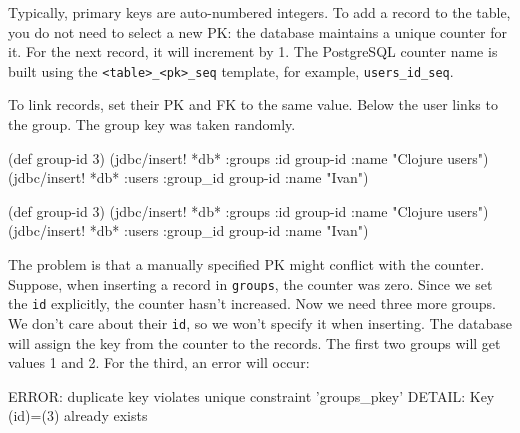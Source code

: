 
Typically, primary keys are auto-numbered integers. To add a record to the table, you do not need to select a new PK: the database maintains a unique counter for it. For the next record, it will increment by 1. The PostgreSQL counter name is built using the \verb|<table>_<pk>_seq| template, for example, \verb|users_id_seq|.

To link records, set their PK and FK to the same value. Below the user links to the group. The group key was taken randomly.

\ifnarrow

\begin{english}
  \begin{clojure}
(def group-id 3)
(jdbc/insert! *db* :groups
  {:id group-id :name "Clojure users"})
(jdbc/insert! *db* :users
  {:group_id group-id :name "Ivan"})
  \end{clojure}
\end{english}

\else

\begin{english}
  \begin{clojure}
(def group-id 3)
(jdbc/insert! *db* :groups {:id group-id :name "Clojure users"})
(jdbc/insert! *db* :users {:group_id group-id :name "Ivan"})
  \end{clojure}
\end{english}

\fi

The problem is that a manually specified PK might conflict with the counter. Suppose, when inserting a record in \verb|groups|, the counter was zero. Since we set the \verb|id| explicitly, the counter hasn't increased. Now we need three more groups. We don't care about their \verb|id|, so we won't specify it when inserting. The database will assign the key from the counter to the records. The first two groups will get values 1 and 2. For the third, an error will occur:


\ifnarrow

\begin{english}
  \begin{text}
ERROR: duplicate key violates
       unique constraint 'groups_pkey'
DETAIL: Key (id)=(3) already exists
  \end{text}
\end{english}

\else

